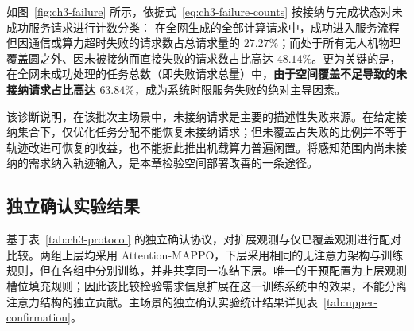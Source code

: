 如图~\ref{fig:ch3-failure} 所示，依据式~\eqref{eq:ch3-failure-counts} 按接纳与完成状态对未成功服务请求进行计数分类：
在全网生成的全部计算请求中，成功进入服务流程但因通信或算力超时失败的请求数占总请求量的 $27.27\%$；而处于所有无人机物理覆盖圆之外、因未被接纳而直接失败的请求数占比高达 $48.14\%$。更为关键的是，在全网未成功处理的任务总数（即失败请求总量）中，\textbf{由于空间覆盖不足导致的未接纳请求占比高达 $63.84\%$}，成为系统时限服务失败的绝对主导因素。

该诊断说明，在该批次主场景中，未接纳请求是主要的描述性失败来源。在给定接纳集合下，仅优化任务分配不能恢复未接纳请求；但未覆盖占失败的比例并不等于轨迹改进可恢复的收益，也不能据此推出机载算力普遍闲置。将感知范围内尚未接纳的需求纳入轨迹输入，是本章检验空间部署改善的一条途径。

\subsection{独立确认实验结果}
\label{sec:upper-results}
\label{sec:ch3-main-results}

基于表~\ref{tab:ch3-protocol} 的独立确认协议，对扩展观测与仅已覆盖观测进行配对比较。两组上层均采用 Attention-MAPPO，下层采用相同的无注意力架构与训练规则，但在各组中分别训练，并非共享同一冻结下层。唯一的干预配置为上层观测槽位填充规则；因此该比较检验需求信息扩展在这一训练系统中的效果，不能分离注意力结构的独立贡献。主场景的独立确认实验统计结果详见表~\ref{tab:upper-confirmation}。

